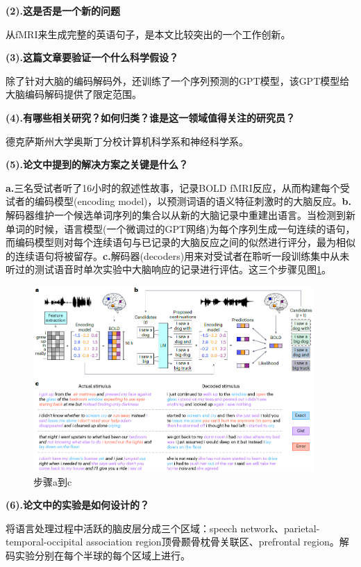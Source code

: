 \documentclass[12pt, a4paper, oneside]{ctexart}
\begin{document}
    \noindent\textbf{(2).这是否是一个新的问题}

    从fMRI来生成完整的英语句子，是本文比较突出的一个工作创新。

    \noindent\textbf{(3).这篇文章要验证一个什么科学假设？}

    除了针对大脑的编码解码外，还训练了一个序列预测的GPT模型，该GPT模型给大脑编码解码提供了限定范围。

    \noindent\textbf{(4).有哪些相关研究？如何归类？谁是这一领域值得关注的研究员？}

    德克萨斯州大学奥斯丁分校计算机科学系和神经科学系。

    \noindent\textbf{(5).论文中提到的解决方案之关键是什么？}

    \textbf{a.}三名受试者听了16小时的叙述性故事，记录BOLD fMRI反应，从而构建每个受试者的编码模型(encoding model)，以预测词语的语义特征刺激时的大脑反应。\textbf{b.}解码器维护一个候选单词序列的集合以从新的大脑记录中重建出语言。当检测到新单词的时候，语言模型(一个微调过的GPT网络)为每个序列生成一句连续的语句，而编码模型则对每个连续语句与已记录的大脑反应之间的似然进行评分，最为相似的连续语句将被留存。\textbf{c.}解码器(decoders)用来对受试者在聆听一段训练集中从未听过的测试语音时单次实验中大脑响应的记录进行评估。这三个步骤见图\ref{step a2c}。

    \begin{figure}[htbp]
        \centering
        \includegraphics[width=0.95\textwidth]{pic/4.5_step a2c}
        \caption{步骤a到c}
        \label{step a2c}
    \end{figure}

    \noindent\textbf{(6).论文中的实验是如何设计的？}

    将语言处理过程中活跃的脑皮层分成三个区域：speech network、parietal-temporal-occipital association region顶骨颞骨枕骨关联区、prefrontal region。解码实验分别在每个半球的每个区域上进行。
\end{document}
